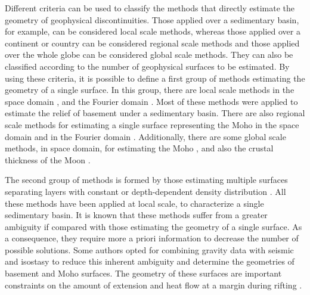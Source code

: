 \documentclass[manuscript]{geophysics}
\begin{document}
Different criteria can be used to classify the methods that directly estimate
the geometry of geophysical discontinuities.
Those applied over a sedimentary basin, for example, can be considered local scale methods,
whereas those applied over a continent or country can be considered regional scale methods
and those applied over the whole globe can be considered global scale methods.
They can also be classified according to the number of geophysical surfaces
to be estimated.
By using these criteria, it is possible to define a first group of methods
estimating the geometry of a single surface.
In this group, there are local scale methods in the space domain
\citep[e.g.,][]{bott1960, tanner1967, cordell-henderson1968, dyrelius-vogel1972, 
pedersen1977, richardson-macinnes1989, barbosa-etal1997, condi-etal1999, 
barbosa-etal1999, barbosa-etal1999b, silva-etal2006,  
chakravarthi-sundararajan2007, martins-etal2010, silva-etal2010, lima-etal2011, 
martins-etal2011, barnes-barraud2012, silva-etal2014, silva-santos2017},
and the Fourier domain
\citep[e.g.,][]{oldenburg1974, granser1987, reamer-ferguson1989, guspi1993}.
Most of these methods were applied to estimate the relief of basement under
a sedimentary basin.
There are also regional scale methods for estimating a single surface 
representing the Moho in the space domain 
\citep[e.g.,][]{shin-etal2009, bagherbandi-eshagh2012, barzaghi-biagi2014, 
sampietro2015, uieda-barbosa2017} and in the Fourier domain 
\citep[e.g.,][]{braitenberg-etal1997, braitenberg-zadro1999, vandermeijde-etal2013}.
Additionally, there are some global scale methods, in space domain, for estimating the Moho
\citep[e.g.,][]{sunkel1985, sjoberg2009}, 
and also the crustal thickness of the Moon \citep{zhang-etal2019}.

The second group of methods is formed by those estimating multiple surfaces
separating layers with constant or depth-dependent density distribution 
\citep[e.g.,][]{condi-etal1999, camacho-etal2011, salem-etal2014, 
ferderer-etal2017, garcia-abdeslem2017, salem2017}.
All these methods have been applied at local scale, to characterize a single 
sedimentary basin.
It is known that these methods suffer from a greater ambiguity if compared with 
those estimating the geometry of a single surface.
As a consequence, they require more a priori information to
decrease the number of possible solutions. 
Some authors opted for combining gravity data with seismic and isostasy 
to reduce this inherent ambiguity and determine the geometries of basement and Moho surfaces.
The geometry of these surfaces are important 
constraints on the amount of extension and heat flow at a margin during rifting
\citep{watts-fairhead1999, gradmann-etal2017}.
\end{document}
